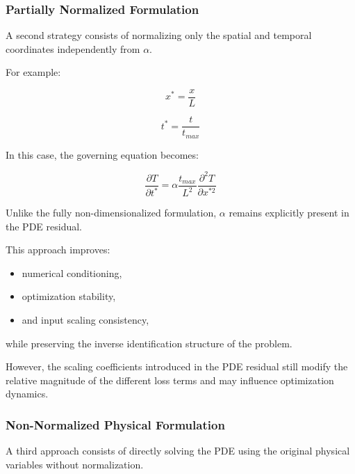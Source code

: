 \subsubsection{Partially Normalized Formulation}

A second strategy consists of normalizing only the spatial and temporal coordinates independently from $\alpha$.

For example:

\begin{equation}
x^*=\frac{x}{L}
\end{equation}

\begin{equation}
t^*=\frac{t}{t_{max}}
\end{equation}

In this case, the governing equation becomes:

\begin{equation}
\frac{\partial T}{\partial t^*}
=
\alpha
\frac{t_{max}}{L^2}
\frac{\partial^2 T}{\partial x^{*2}}
\end{equation}

Unlike the fully non-dimensionalized formulation, $\alpha$ remains explicitly present in the PDE residual.

This approach improves:
\begin{itemize}
    \item numerical conditioning,
    \item optimization stability,
    \item and input scaling consistency,
\end{itemize}

while preserving the inverse identification structure of the problem.

However, the scaling coefficients introduced in the PDE residual still modify the relative magnitude of the different loss terms and may influence optimization dynamics.

\subsubsection{Non-Normalized Physical Formulation}

A third approach consists of directly solving the PDE using the original physical variables without normalization.

